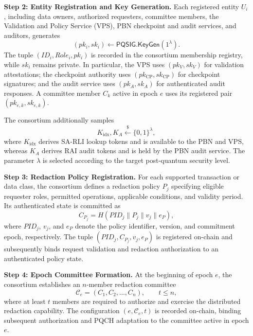 \documentclass[lettersize,journal]{IEEEtran}
\begin{document}
\textbf{Step 2: Entity Registration and Key Generation.}
Each registered entity $U_i$, including data owners, authorized
requesters, committee members, the Validation and Policy Service
(VPS), PBN checkpoint and audit services, and auditors, generates
\begin{equation}
(pk_i,sk_i)\leftarrow
\mathsf{PQSIG.KeyGen}(1^\lambda).
\end{equation}
The tuple $(ID_i,Role_i,pk_i)$ is recorded in the consortium membership
registry, while $sk_i$ remains private. In particular, the VPS uses
$(pk_V,sk_V)$ for validation attestations; the checkpoint authority uses
$(pk_{\mathrm{CP}},sk_{\mathrm{CP}})$ for checkpoint signatures; and the
audit service uses $(pk_A,sk_A)$ for authenticated audit responses.
A committee member $C_k$ active in epoch $e$ uses its registered pair
$(pk_{e,k},sk_{e,k})$.

The consortium additionally samples
\begin{equation}
K_{\mathrm{idx}},K_A
\stackrel{\$}{\leftarrow}\{0,1\}^{\lambda},
\end{equation}
where $K_{\mathrm{idx}}$ derives SA-RLI lookup tokens and is available
to the PBN and VPS, whereas $K_A$ derives RAI audit tokens and is held
by the PBN audit service. The parameter $\lambda$ is selected according
to the target post-quantum security level.

\textbf{Step 3: Redaction Policy Registration.}
For each supported transaction or data class, the consortium defines a
redaction policy $P_j$ specifying eligible requester roles, permitted
operations, applicable conditions, and validity period. Its authenticated
state is committed as
\begin{equation}
C_{P_j}
=
H(PID_j\parallel P_j\parallel v_j\parallel e_P),
\end{equation}
where $PID_j$, $v_j$, and $e_P$ denote the policy identifier, version,
and commitment epoch, respectively. The tuple
$(PID_j,C_{P_j},v_j,e_P)$ is registered on-chain and subsequently binds
request validation and redaction authorization to an authenticated
policy state.

\textbf{Step 4: Epoch Committee Formation.}
At the beginning of epoch $e$, the consortium establishes an
$n$-member redaction committee
\begin{equation}
\mathcal{C}_e=(C_1,C_2,\ldots,C_n),\qquad t\leq n,
\end{equation}
where at least $t$ members are required to authorize and exercise the
distributed redaction capability. The configuration
$(e,\mathcal{C}_e,t)$ is recorded on-chain, binding subsequent
authorization and PQCH adaptation to the committee active in epoch $e$.
\end{document}
